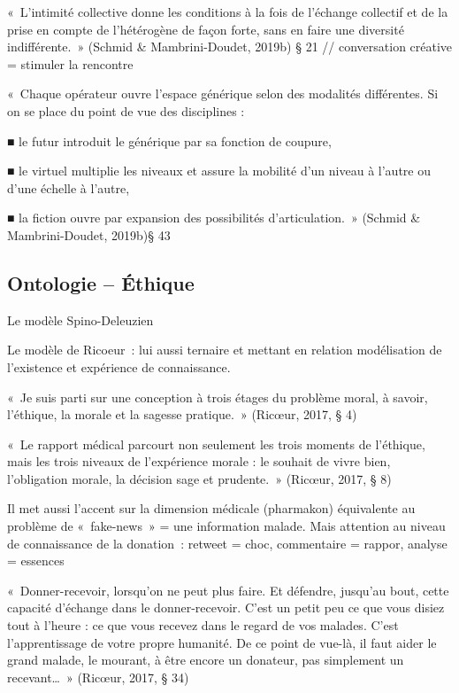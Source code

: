 \documentclass[
  letterpaper,
  DIV=11,
  numbers=noendperiod]{scrreprt}
\begin{document}
«~L'intimité collective donne les conditions à la fois de l'échange
collectif et de la prise en compte de l'hétérogène de façon forte, sans
en faire une diversité indifférente.~» (Schmid \& Mambrini-Doudet,
2019b) § 21 // conversation créative = stimuler la rencontre

«~Chaque opérateur ouvre l'espace générique selon des modalités
différentes. Si on se place du point de vue des disciplines :

■ le futur introduit le générique par sa fonction de coupure,

■ le virtuel multiplie les niveaux et assure la mobilité d'un niveau à
l'autre ou d'une échelle à l'autre,

■ la fiction ouvre par expansion des possibilités d'articulation.~»
(Schmid \& Mambrini-Doudet, 2019b)§ 43

\hypertarget{ontologie-uxe9thique}{%
\subsection{Ontologie -- Éthique}\label{ontologie-uxe9thique}}

Le modèle Spino-Deleuzien

Le modèle de Ricoeur~: lui aussi ternaire et mettant en relation
modélisation de l'existence et expérience de connaissance.

«~Je suis parti sur une conception à trois étages du problème moral, à
savoir, l'éthique, la morale et la sagesse pratique.~» (Ricœur, 2017, §
4)

«~Le rapport médical parcourt non seulement les trois moments de
l'éthique, mais les trois niveaux de l'expérience morale : le souhait de
vivre bien, l'obligation morale, la décision sage et prudente.~»
(Ricœur, 2017, § 8)

Il met aussi l'accent sur la dimension médicale (pharmakon) équivalente
au problème de «~fake-news~» = une information malade. Mais attention au
niveau de connaissance de la donation~: retweet = choc, commentaire =
rappor, analyse = essences

«~Donner-recevoir, lorsqu'on ne peut plus faire. Et défendre, jusqu'au
bout, cette capacité d'échange dans le donner-recevoir. C'est un petit
peu ce que vous disiez tout à l'heure : ce que vous recevez dans le
regard de vos malades. C'est l'apprentissage de votre propre humanité.
De ce point de vue-là, il faut aider le grand malade, le mourant, à être
encore un donateur, pas simplement un recevant\ldots~» (Ricœur, 2017, §
34)
\end{document}
